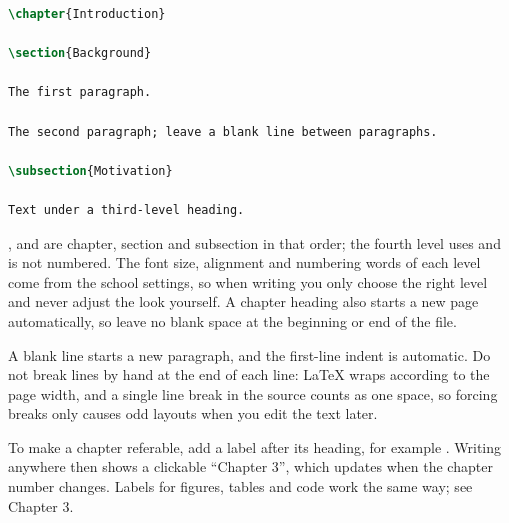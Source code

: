 \begin{lstlisting}[language=latex]
\chapter{Introduction}

\section{Background}

The first paragraph.

The second paragraph; leave a blank line between paragraphs.

\subsection{Motivation}

Text under a third-level heading.
\end{lstlisting}

\code{\chapter}, \code{\section} and \code{\subsection} are chapter, section and subsection in that order; the fourth level uses \code{\subsubsection} and is not numbered. The font size, alignment and numbering words of each level come from the school settings, so when writing you only choose the right level and never adjust the look yourself. A chapter heading also starts a new page automatically, so leave no blank space at the beginning or end of the file.

A blank line starts a new paragraph, and the first-line indent is automatic. Do not break lines by hand at the end of each line: \LaTeX{} wraps according to the page width, and a single line break in the source counts as one space, so forcing breaks only causes odd layouts when you edit the text later.

To make a chapter referable, add a label after its heading, for example . Writing \code{\ref{cha:method}} anywhere then shows a clickable ``Chapter 3'', which updates when the chapter number changes. Labels for figures, tables and code work the same way; see Chapter 3.

